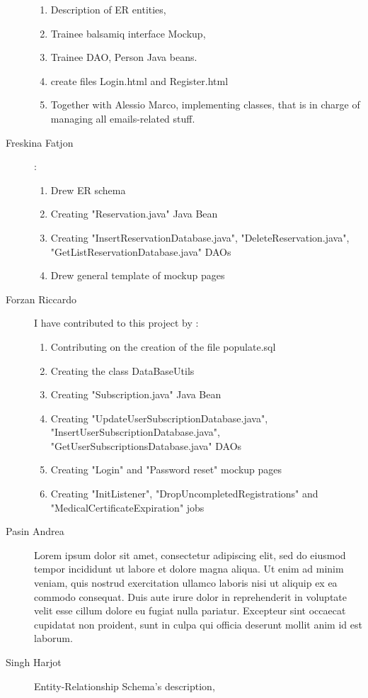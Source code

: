 \begin{description}
\begin{enumerate}
		\item Description of ER entities,
		\item Trainee balsamiq interface Mockup,
		\item Trainee DAO, Person Java beans.
		\item create files Login.html and Register.html  
		\item Together with Alessio Marco, implementing classes, that is in charge of managing all emails-related stuff.
	\end{enumerate}
	\item[Freskina Fatjon] :
	\begin{enumerate}
		\item Drew ER schema 
		\item Creating "Reservation.java" Java Bean 
		\item Creating "InsertReservationDatabase.java", "DeleteReservation.java", "GetListReservationDatabase.java" DAOs
		\item Drew general template of mockup pages 
	\end{enumerate} 

	\item[Forzan Riccardo] I have contributed to this project by :
	\begin{enumerate}
		\item Contributing on the creation of the file populate.sql
   		\item Creating the class DataBaseUtils
   		\item Creating "Subscription.java" Java Bean
   		\item Creating "UpdateUserSubscriptionDatabase.java", "InsertUserSubscriptionDatabase.java", "GetUserSubscriptionsDatabase.java" DAOs
   		\item Creating "Login" and "Password reset" mockup pages
   		\item Creating "InitListener", "DropUncompletedRegistrations" and "MedicalCertificateExpiration" jobs
    \end{enumerate}

	\item[Pasin Andrea] Lorem ipsum dolor sit amet, consectetur adipiscing elit, sed do eiusmod tempor incididunt ut labore et dolore magna aliqua. Ut enim ad minim veniam, quis nostrud exercitation ullamco laboris nisi ut aliquip ex ea commodo consequat. Duis aute irure dolor in reprehenderit in voluptate velit esse cillum dolore eu fugiat nulla pariatur. Excepteur sint occaecat cupidatat non proident, sunt in culpa qui officia deserunt mollit anim id est laborum.
	\item[Singh Harjot] Entity-Relationship Schema's description,
	

\end{description}
